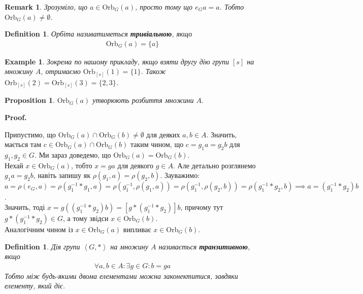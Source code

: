 \documentclass[a4paper, 10pt]{article}
\makeatletter
\theoremstyle{theoremdd}
\theoremstyle{theoremdd}
\newtheorem{definition}[theorem]{Definition}
\theoremstyle{theoremdd}
\theoremstyle{theoremdd}
\theoremstyle{theoremdd}
\newtheorem{example}[theorem]{Example}
\theoremstyle{theoremdd}
\theoremstyle{theoremdd}
\theoremstyle{theoremdd}
\theoremstyle{theoremdd}
\newtheorem{proposition}[theorem]{Proposition}
\theoremstyle{theoremdd}
\theoremstyle{theoremdd}
\newtheorem{remark}[theorem]{Remark}
\theoremstyle{theoremdd}
\theoremstyle{theoremdd}
\theoremstyle{theoremdd}
\theoremstyle{theoremdd}
\renewenvironment{proof}[1][Proof.\\]{\par
\pushQED{\hfill \qed}%
\normalfont \topsep6\p@\@plus6\p@\relax
\trivlist
\item\relax
{\bfseries
#1\@addpunct{.}}\hspace\labelsep\ignorespaces
}{%
\popQED\endtrivlist\@endpefalse
}
\newcommand\Orb{\text{Orb}}
\makeatother
\begin{document}
\begin{remark}
Зрозуміло, що $a \in \Orb_G(a)$, просто тому що $e_G a = a$. Тобто $\Orb_G(a) \neq \emptyset$.
\end{remark}

\begin{definition}
Орбіта називатиметься \textbf{тривіальною}, якщо
\begin{align*}
\Orb_G(a) = \{a\}
\end{align*}
\end{definition}

\begin{example}
Зокрема по нашому прикладу, якщо взяти другу дію групи $[s]$ на множину $A$, отримаємо $\Orb_{[s]}(1) = \{1\}$. Також $\Orb_{[s]}(2) = \Orb_{[s]}(3) = \{2,3\}$.
\end{example}

\begin{proposition}
$\Orb_G(a)$ утворюють розбиття множини $A$.
\end{proposition}

\begin{proof}
Припустимо, що $\Orb_G(a) \cap \Orb_G(b) \neq \emptyset$ для деяких $a,b \in A$. Значить, мається там $c \in \Orb_G(a) \cap \Orb_G(b)$ таким чином, що $c = g_1 a = g_2 b$ для $g_1,g_2 \in G$. Ми зараз доведемо, що $\Orb_G(a) = \Orb_G(b)$.\\
Нехай $x \in \Orb_G(a)$, тобто $x = ga$ для деякого $g \in A$. Але детально розглянемо $g_1 a = g_2 b$, навіть запишу як $\rho(g_1,a) = \rho(g_2,b)$. Зауважимо:\\
$a = \rho(e_G, a) = \rho(g_1^{-1}*g_1, a) = \rho(g_1^{-1}, \rho(g_1,a)) = \rho(g_1^{-1}, \rho(g_2,b)) = \rho(g_1^{-1}*g_2,b) \implies a = (g_1^{-1}*g_2) b$.\\
Значить, тоді $x = g((g_1^{-1}*g_2) b) = [g*(g_1^{-1}*g_2)] b$, причому тут $g*(g_1^{-1}*g_2) \in G$, а тому звідси $x \in \Orb_G(b)$.\\
Аналогічним чином із $x \in \Orb_G(a)$ випливає $x \in \Orb_G(b)$.
\end{proof}

\begin{definition}
Дія групи $\left< G,*\right>$ на множину $A$ називається \textbf{транзитивною}, якщо
\begin{align*}
\forall a,b \in A: \exists g \in G: b = ga
\end{align*}
Тобто між будь-якими двома елементами можна законектитися, завдяки елементу, який діє.
\end{definition}
\end{document}
